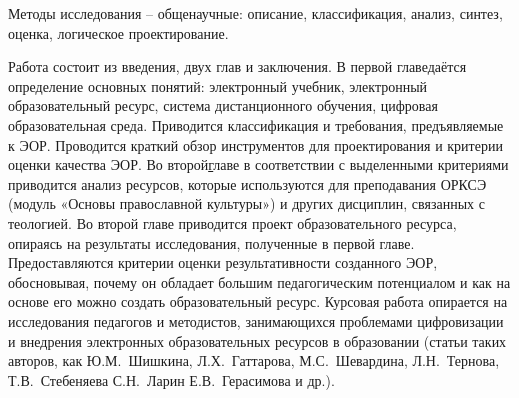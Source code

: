 Методы исследования – общенаучные: описание, классификация, анализ, синтез, оценка, логическое проектирование.

Работа состоит из введения, двух глав и заключения. В первой главе\hyperref[section1] даётся определение основных понятий: электронный учебник, электронный образовательный ресурс, система дистанционного обучения, цифровая образовательная среда. Приводится классификация и требования, предъявляемые к ЭОР. Проводится краткий обзор инструментов для проектирования и критерии оценки качества ЭОР.
Во второй\hyperref[section2] главе в соответствии с выделенными критериями приводится анализ ресурсов, которые используются для преподавания ОРКСЭ (модуль «Основы православной культуры») и других дисциплин, связанных с теологией. Во второй главе приводится проект образовательного ресурса, опираясь на результаты исследования, полученные в первой главе.
Предоставляются критерии оценки результативности созданного ЭОР, обосновывая, почему он обладает большим педагогическим потенциалом и как на основе его можно создать образовательный ресурс.
Курсовая работа опирается на исследования педагогов и методистов, занимающихся проблемами цифровизации и внедрения электронных образовательных ресурсов в образовании (статьи таких авторов, как Ю.М.~Шишкина, Л.Х.~Гаттарова, М.С.~Шевардина, Л.Н.~Тернова, Т.В.~Стебеняева С.Н.~Ларин Е.В.~Герасимова и др.).
